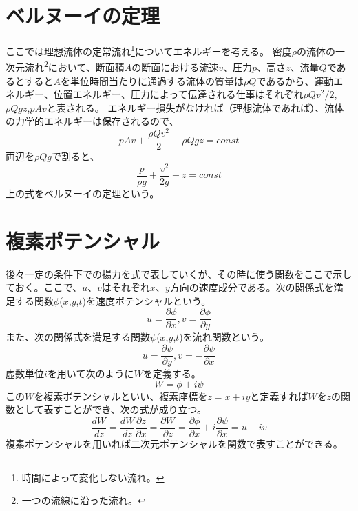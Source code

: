 \documentclass[10pt,b5paper,papersize,dvipdfmx]{jsbook}
\begin{document}
\section{ベルヌーイの定理}
ここでは理想流体の定常流れ\footnote{時間によって変化しない流れ。}についてエネルギーを考える。
密度$\rho$の流体の一次元流れ\footnote{一つの流線に沿った流れ。}において、断面積$A$の断面における流速$v$、圧力$p$、高さ$z$、流量$Q$であるとすると$A$を単位時間当たりに通過する流体の質量は$\rho$$Q$であるから、運動エネルギー、位置エネルギー、圧力によって伝達される仕事はそれぞれ$\rho$$Qv^2/2$,$\rho Qgz$,$pAv$と表される。
エネルギー損失がなければ（理想流体であれば）、流体の力学的エネルギーは保存されるので、
\begin{equation}
pAv+\frac{\rho Qv^2}{2}+\rho Qgz=const
\end{equation}
両辺を$\rho Qg$で割ると、
\begin{equation}
\frac{p}{\rho g}+\frac{v^2}{2g}+z=const
\end{equation}
上の式をベルヌーイの定理という。
\par
\section{複素ポテンシャル}
後々一定の条件下での揚力を式で表していくが、その時に使う関数をここで示しておく。ここで、$u$、$v$はそれぞれ$x$、$y$方向の速度成分である。次の関係式を満足する関数$\phi$($x$,$y$,$t$)を速度ポテンシャルという。
\begin{equation}
u=\frac{\partial\phi}{\partial x}, v=\frac{\partial\phi}{\partial y}
\end{equation}
また、次の関係式を満足する関数$\psi$($x$,$y$,$t$)を流れ関数という。
\begin{equation}
u=\frac{\partial\psi}{\partial y}, v=-\frac{\partial\psi}{\partial x}
\end{equation}
虚数単位$i$を用いて次のように$W$を定義する。
\begin{equation}
W=\phi+i\psi
\end{equation}
この$W$を複素ポテンシャルといい、複素座標を$z=x+iy$と定義すれば$W$を$z$の関数として表すことができ、次の式が成り立つ。
\begin{equation}
\frac{dW}{dz}=\frac{dW}{dz}\frac{\partial z}{\partial x}=\frac{\partial W}{\partial z}=\frac{\partial\phi}{\partial x}+i\frac{\partial\psi}{\partial x}=u-iv
\end{equation}
複素ポテンシャルを用いれば二次元ポテンシャルを関数で表すことができる。
\end{document}
